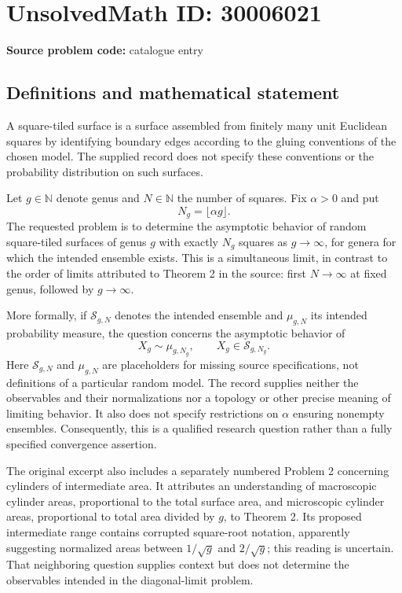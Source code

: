 \documentclass[11pt]{article}
\newcommand{\N}{\mathbb{N}}
\begin{document}
\section*{UnsolvedMath ID: 30006021}
\textbf{Source problem code:} catalogue entry
\subsection{Definitions and mathematical statement}
A square-tiled surface is a surface assembled from finitely many unit Euclidean squares by identifying boundary edges according to the gluing conventions of the chosen model. The supplied record does not specify these conventions or the probability distribution on such surfaces.

Let \(g\in\N\) denote genus and \(N\in\N\) the number of squares. Fix \(\alpha>0\) and put
\[
N_g=\lfloor\alpha g\rfloor.
\]
The requested problem is to determine the asymptotic behavior of random square-tiled surfaces of genus \(g\) with exactly \(N_g\) squares as \(g\to\infty\), for genera for which the intended ensemble exists. This is a simultaneous limit, in contrast to the order of limits attributed to Theorem 2 in the source: first \(N\to\infty\) at fixed genus, followed by \(g\to\infty\).

More formally, if \(\mathcal S_{g,N}\) denotes the intended ensemble and \(\mu_{g,N}\) its intended probability measure, the question concerns the asymptotic behavior of
\[
X_g\sim\mu_{g,N_g},\qquad X_g\in\mathcal S_{g,N_g}.
\]
Here \(\mathcal S_{g,N}\) and \(\mu_{g,N}\) are placeholders for missing source specifications, not definitions of a particular random model. The record supplies neither the observables and their normalizations nor a topology or other precise meaning of limiting behavior. It also does not specify restrictions on \(\alpha\) ensuring nonempty ensembles. Consequently, this is a qualified research question rather than a fully specified convergence assertion.

The original excerpt also includes a separately numbered Problem 2 concerning cylinders of intermediate area. It attributes an understanding of macroscopic cylinder areas, proportional to the total surface area, and microscopic cylinder areas, proportional to total area divided by \(g\), to Theorem 2. Its proposed intermediate range contains corrupted square-root notation, apparently suggesting normalized areas between \(1/\sqrt g\) and \(2/\sqrt g\); this reading is uncertain. That neighboring question supplies context but does not determine the observables intended in the diagonal-limit problem.
\end{document}

